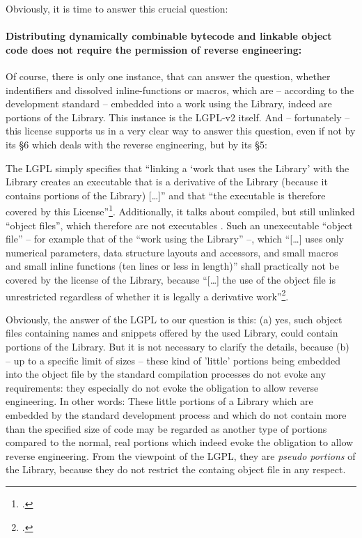 Obviously, it is time to answer this crucial question:

\paragraph{Distributing dynamically combinable bytecode and linkable object code
does not require the permission of reverse engineering:} 

Of course, there is only one instance, that can answer the question, whether
indentifiers and dissolved inline-functions or macros, which are -- according to
the development standard -- embedded into a work using the Library, indeed are
portions of the Library. This instance is the LGPL-v2 itself. And -- fortunately
-- this license supports us in a very clear way to answer this question, even if
not by its §6 which deals with the reverse engineering, but by its §5:

The LGPL simply specifies that \enquote{linking a \enquote{work that uses the
Library} with the Library creates an executable that is a derivative of the
Library (because it contains portions of the Library) [\ldots]} and that
\enquote{the executable is therefore covered by this
License}\footcite[cf.][\nopage wp. §5]{Lgpl21OsiLicense1999a}. Additionally, it
talks about compiled, but still unlinked \enquote{object files}, which therefore
are not executables . Such an unexecutable \enquote{object file} -- for example
that of the \enquote{work using the Library} --, which \enquote{[\ldots] uses
only numerical parameters, data structure layouts and accessors, and small
macros and small inline functions (ten lines or less in length)} shall
practically not be covered by the license of the Library, because
\enquote{[\ldots] the use of the object file is unrestricted regardless of
whether it is legally a derivative work}\footcite[cf.][\nopage wp.
§5]{Lgpl21OsiLicense1999a}.

Obviously, the answer of the LGPL to our question is this: (a) yes, such
object files containing names and snippets offered by the used Library, could
contain portions of the Library. But it is not necessary to clarify the details,
because (b) -- up to a specific limit of sizes -- these kind of 'little'
portions being embedded into the object file by the standard compilation
processes do not evoke any requirements: they especially do not evoke the
obligation to allow reverse engineering. In other words: These little portions
of a Library which are embedded by the standard development process and which do
not contain more than the specified size of code may be regarded as another type
of portions compared to the normal, real portions which indeed evoke the
obligation to allow reverse engineering. From the viewpoint of the LGPL, they
are \emph{pseudo portions} of the Library, because they do not restrict the
containg object file in any respect.

